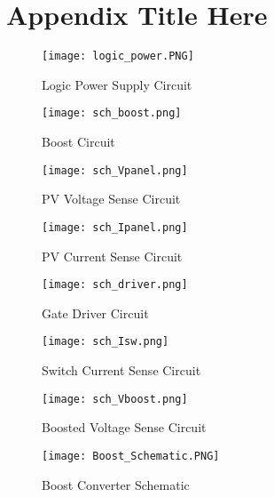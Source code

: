 
\chapter{Appendix Title Here} %

\label{AppendixA} %


\begin{figure}[h]
\centering
\texttt{[image: logic\_power.PNG]}
\caption{Logic Power Supply Circuit}
\label{logic power fig}
\end{figure}


\begin{figure}[h]
\centering
\texttt{[image: sch\_boost.png]}
\caption{Boost Circuit}
\label{Figure E}
\end{figure}

\begin{figure}[h]
\centering
\texttt{[image: sch\_Vpanel.png]}
\caption{PV Voltage Sense Circuit}
\label{Figure F}
\end{figure}

\begin{figure}[h]
\centering
\texttt{[image: sch\_Ipanel.png]}
\caption{PV Current Sense Circuit}
\label{Figure G}
\end{figure}

\begin{figure}[h]
\centering
\texttt{[image: sch\_driver.png]}
\caption{ Gate Driver Circuit}
\label{Figure H}
\end{figure}

\begin{figure}[h]
\centering
\texttt{[image: sch\_Isw.png]}
\caption{Switch Current Sense Circuit}
\label{Figure I}
\end{figure}

\begin{figure}[h]
\centering
\texttt{[image: sch\_Vboost.png]}
\caption{Boosted Voltage Sense Circuit}
\label{Figure J}
\end{figure}

\begin{figure}[h]
\centering
\texttt{[image: Boost\_Schematic.PNG]}
\caption{Boost Converter Schematic}
\label{Figure 6}
\end{figure}

